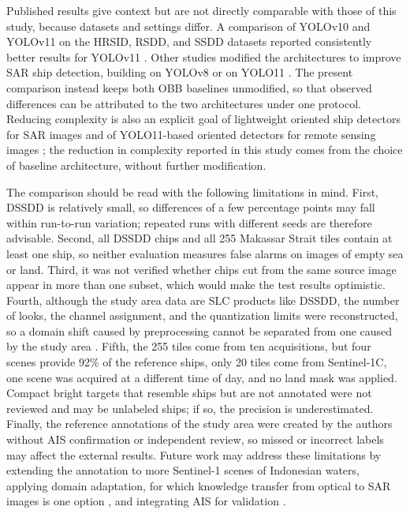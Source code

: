 \documentclass[conference]{IEEEtran}
\begin{document}
Published results give context but are not directly comparable with those of this study, because datasets and settings differ. A comparison of YOLOv10 and YOLOv11 on the HRSID, RSDD, and SSDD datasets reported consistently better results for YOLOv11 \cite{cavli2025}. Other studies modified the architectures to improve SAR ship detection, building on YOLOv8 \cite{gao2025styolov8,li2025rsabm} or on YOLO11 \cite{li2026acmix,wan2026msadet}. The present comparison instead keeps both OBB baselines unmodified, so that observed differences can be attributed to the two architectures under one protocol. Reducing complexity is also an explicit goal of lightweight oriented ship detectors for SAR images \cite{meng2024lsrdet} and of YOLO11-based oriented detectors for remote sensing images \cite{huang2024lwyolo11}; the reduction in complexity reported in this study comes from the choice of baseline architecture, without further modification.

The comparison should be read with the following limitations in mind. First, DSSDD is relatively small, so differences of a few percentage points may fall within run-to-run variation; repeated runs with different seeds are therefore advisable. Second, all DSSDD chips and all 255 Makassar Strait tiles contain at least one ship, so neither evaluation measures false alarms on images of empty sea or land. Third, it was not verified whether chips cut from the same source image appear in more than one subset, which would make the test results optimistic. Fourth, although the study area data are SLC products like DSSDD, the number of looks, the channel assignment, and the quantization limits were reconstructed, so a domain shift caused by preprocessing cannot be separated from one caused by the study area \cite{tu2025mamba,yang2024uda}. Fifth, the 255 tiles come from ten acquisitions, but four scenes provide 92\% of the reference ships, only 20 tiles come from Sentinel-1C, one scene was acquired at a different time of day, and no land mask was applied. Compact bright targets that resemble ships but are not annotated were not reviewed and may be unlabeled ships; if so, the precision is underestimated. Finally, the reference annotations of the study area were created by the authors without AIS confirmation or independent review, so missed or incorrect labels may affect the external results. Future work may address these limitations by extending the annotation to more Sentinel-1 scenes of Indonesian waters, applying domain adaptation, for which knowledge transfer from optical to SAR images is one option \cite{wang2026o2s}, and integrating AIS for validation \cite{pelich2019}.
\end{document}
